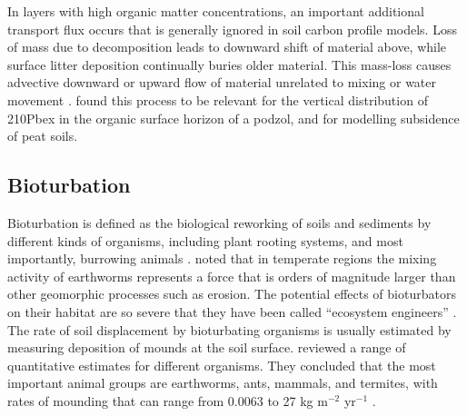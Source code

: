 \documentclass[11pt, oneside, a4paper]{article}   	%
\begin{document}
In layers with high organic matter concentrations, an important additional transport flux occurs that is generally ignored in soil carbon profile models. Loss of mass due
to decomposition leads to downward shift of material above, while surface litter deposition continually buries older material. This mass-loss causes advective downward or upward flow
of material unrelated to mixing or water movement \citep{Ahrens2015}. \citep{Kaste2007} found this
process to be relevant for the vertical distribution of 210Pbex in the organic surface
horizon of a podzol, and \citet{Hilbert2000} for modelling subsidence of peat soils. 

\subsection{Bioturbation}
Bioturbation is defined as the biological reworking of soils and sediments by different kinds of organisms, including plant rooting systems, and most importantly, burrowing animals \citep{Meysman2006}. \citet{Chapin2002} noted that in temperate
regions the mixing activity of earthworms represents a force that is orders of magnitude
larger than other geomorphic processes such as erosion. The potential effects of
bioturbators on their habitat are so severe that they have been called “ecosystem
engineers” \citep{Meysman2006}.
The rate of soil displacement by bioturbating organisms is usually estimated by
measuring deposition of mounds at the soil surface. \citet{Paton1995} reviewed
a range of quantitative estimates for different organisms. They concluded that the
most important animal groups are earthworms, ants, mammals, and termites, with rates
of mounding that can range from 0.0063 to 27 kg m$^{-2}$ yr$^{-1}$ . 
\end{document}
